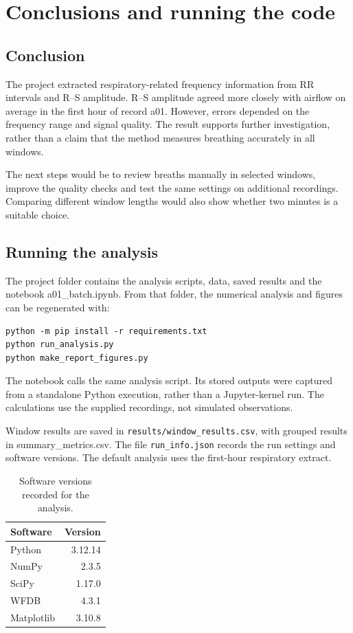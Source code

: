 \chapter{Conclusions and running the code}\label{ch:10}

\section{Conclusion}

The project extracted respiratory-related frequency information from RR intervals and R--S amplitude. R--S amplitude agreed more closely with airflow on average in the first hour of record a01. However, errors depended on the frequency range and signal quality. The result supports further investigation, rather than a claim that the method measures breathing accurately in all windows.

The next steps would be to review breaths manually in selected windows, improve the quality checks and test the same settings on additional recordings. Comparing different window lengths would also show whether two minutes is a suitable choice.

\section{Running the analysis}

The project folder contains the analysis scripts, data, saved results and the notebook a01\_batch.ipynb. From that folder, the numerical analysis and figures can be regenerated with:

\begin{lstlisting}[language={},caption={Commands for the analysis project.}]
python -m pip install -r requirements.txt
python run_analysis.py
python make_report_figures.py
\end{lstlisting}

The notebook calls the same analysis script. Its stored outputs were captured from a standalone Python execution, rather than a Jupyter-kernel run. The calculations use the supplied recordings, not simulated observations.

Window results are saved in \texttt{results/window\_results.csv}, with grouped results in summary\_metrics.csv. The file \texttt{run\_info.json} records the run settings and software versions. The default analysis uses the first-hour respiratory extract.

\begin{table}[H]
\centering
\caption{Software versions recorded for the analysis.}
\small
\begin{tabular}{lr}
\toprule
\textbf{Software} & \textbf{Version} \\
\midrule
Python & 3.12.14 \\
NumPy & 2.3.5 \\
SciPy & 1.17.0 \\
WFDB & 4.3.1 \\
Matplotlib & 3.10.8 \\
\bottomrule
\end{tabular}
\end{table}

